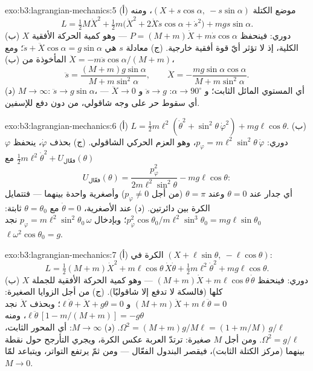 \begin{solution}{exo:b3:lagrangian-mechanics:5}
(أ) موضع الكتلة $(X + s\cos\alpha,\ -s\sin\alpha)$، ومنه
\[
L = \tfrac12 M\dot X^2 + \tfrac12 m\big(\dot X^2 +
2\dot X\dot s\cos\alpha + \dot s^2\big) + mgs\sin\alpha .
\]
(ب) $X$ دوري: فينحفظ $P = (M + m)\dot X + m\dot s\cos\alpha$
--- وهو كمية الحركة الأفقية الكلية، إذ لا تؤثر أيّ قوة أفقية
خارجية. (ج) معادلة $s$ هي $\ddot s + \ddot
X\cos\alpha = g\sin\alpha$؛ ومع $\ddot X = -m\ddot s\cos\alpha/(M +
m)$ المأخوذة من (ب)،
\[
\ddot s = \frac{(M + m)g\sin\alpha}{M + m\sin^2\alpha} , \qquad
\ddot X = -\frac{mg\sin\alpha\cos\alpha}{M + m\sin^2\alpha} .
\]
(د) $M \to \infty$: $\ddot s \to g\sin\alpha$، أي المستوي المائل الثابت؛
و $\alpha \to 90^\circ$: $\ddot s \to g$ و $\ddot X \to 0$ --- أي سقوط حر
على وجه شاقولي، من دون دفع للإسفين.
\end{solution}

\begin{solution}{exo:b3:lagrangian-mechanics:6}
(أ) $L = \tfrac12 m\ell^2(\dot\theta^2 + \sin^2\theta\,\dot\varphi^2) +
mg\ell\cos\theta$. (ب) $\varphi$ دوري: $p_\varphi =
m\ell^2\sin^2\theta\,\dot\varphi$، وهو العزم الحركي الشاقولي. (ج)
بحذف $\dot\varphi$، ينحفظ $\tfrac12 m\ell^2\dot\theta^2 +
U_{\text{فعّال}}(\theta)$ مع
\[
U_{\text{فعّال}}(\theta) = \frac{p_\varphi^2}{2m\ell^2\sin^2\theta}
 - mg\ell\cos\theta :
\]
أي جدار عند $\theta = 0$ وعند $\theta = \pi$ (من أجل $p_\varphi \neq 0$)
وأصغرية واحدة بينهما --- فتتمايل الكرة بين دائرتين. (د) عند
الأصغرية، $\dot\theta = 0$ مع $\theta = \theta_0$ ثابتة:
$p_\varphi^2\cos\theta_0/m\ell^2\sin^3\theta_0 = mg\ell\sin\theta_0$؛
وبإدخال $p_\varphi = m\ell^2\sin^2\theta_0\,\omega$ نجد
$\ell\omega^2\cos\theta_0 = g$.
\end{solution}

\begin{solution}{exo:b3:lagrangian-mechanics:7}
(أ) الكرة في $(X + \ell\sin\theta,\ -\ell\cos\theta)$:
\[
L = \tfrac12(M + m)\dot X^2 + m\ell\cos\theta\,\dot X\dot\theta
 + \tfrac12 m\ell^2\dot\theta^2 + mg\ell\cos\theta .
\]
(ب) $X$ دوري: فينحفظ $(M + m)\dot X + m\ell\cos\theta\,\dot\theta$
--- وهو كمية الحركة الأفقية للجملة كلها (فالسكة لا تدفع إلا
شاقوليًا). (ج) من أجل الزوايا الصغيرة: $(M + m)\ddot X +
m\ell\ddot\theta = 0$ و $\ell\ddot\theta + \ddot X + g\theta = 0$؛
وبحذف $\ddot X$ نجد $\ell\ddot\theta\,[1 - m/(M + m)] = -g\theta$،
ومنه $\Omega^2 = (M + m)g/M\ell = (1 + m/M)\,g/\ell$. (د) $M \to \infty$:
أي المحور الثابت، $\Omega^2 = g/\ell$. ومن أجل $M$ صغيرة: ترتدّ
العربة عكس الكرة، ويجري التأرجح حول نقطة بينهما (مركز الكتلة
الثابت)، فيقصر البندول الفعّال --- ومن ثمّ يرتفع التواتر، ويتباعد
لمّا $M \to 0$.
\end{solution}

